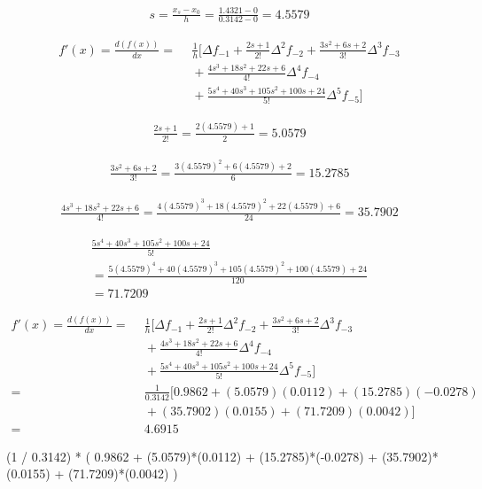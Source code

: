 \begin{align*}
    s = \frac{x_s - x_0}{h} = \frac{1.4321 - 0}{ 0.3142 - 0} = 4.5579
\end{align*}

\begin{align*}
    f'(x) = \frac{d(f(x))}{dx} =~&~  \frac{1}{h} \Bigg[ \Delta f_{-1} + \frac{2s + 1}{2!} \Delta^2 f_{-2} + \frac{3s^2 + 6s + 2}{3!} \Delta^3 f_{-3} \\
        &~+ \frac{4s^3 + 18s^2 + 22s + 6}{4!} \Delta^4 f_{-4} \\
        &~+ \frac{5s^4 + 40s^3 + 105s^2 + 100s + 24}{5!} \Delta^5 f_{-5}
        \Bigg]
\end{align*}

\begin{align*}
    \frac{2s + 1}{2!} = \frac{2(4.5579) + 1}{2} = 5.0579
\end{align*}

\begin{align*}
    \frac{3s^2 + 6s + 2}{3!} = \frac{3(4.5579)^2 + 6(4.5579) + 2}{6} = 15.2785
\end{align*}

\begin{align*}
    \frac{4s^3 + 18s^2 + 22s + 6}{4!} = \frac{4(4.5579)^3 + 18(4.5579)^2 + 22(4.5579) + 6}{24} = 35.7902
\end{align*}

\begin{multline*}
    \frac{5s^4 + 40s^3 + 105s^2 + 100s + 24}{5!} \\
    = \frac{5(4.5579)^4 + 40(4.5579)^3 + 105(4.5579)^2 + 100(4.5579) + 24}{120} \\
    = 71.7209
\end{multline*}

\begin{align*}
    f'(x) = \frac{d(f(x))}{dx} =~&~  \frac{1}{h} \Bigg[ \Delta f_{-1} + \frac{2s + 1}{2!} \Delta^2 f_{-2} + \frac{3s^2 + 6s + 2}{3!} \Delta^3 f_{-3} \\
        &~+ \frac{4s^3 + 18s^2 + 22s + 6}{4!} \Delta^4 f_{-4} \\
        &~+ \frac{5s^4 + 40s^3 + 105s^2 + 100s + 24}{5!} \Delta^5 f_{-5}
        \Bigg] \\
        =~&~  \frac{1}{0.3142} \Bigg[ 0.9862 + (5.0579) (0.0112) + (15.2785) (-0.0278) \\
        &~+ (35.7902) (0.0155) + (71.7209) (0.0042)
        \Bigg] \\
        =~&~ 4.6915
\end{align*}

(1 / 0.3142) * (  0.9862 + (5.0579)*(0.0112) + (15.2785)*(-0.0278) + (35.7902)*(0.0155) + (71.7209)*(0.0042) )